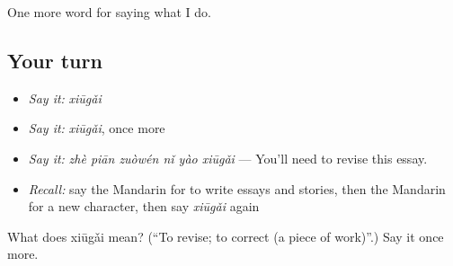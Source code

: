 \begin{grammarlens}[title={What you've built}]
One more word for saying what I do.
\end{grammarlens}

\subsection*{Your turn}
\begin{itemize}
\raggedright
  \item \emph{Say it:} \emph{xiūgǎi}
  \item \emph{Say it:} \emph{xiūgǎi}, once more
  \item \emph{Say it:} \emph{zhè piān zuòwén nǐ yào xiūgǎi} — You'll need to revise this essay.
  \item \emph{Recall:} say the Mandarin for to write essays and stories, then the Mandarin for a new character, then say \emph{xiūgǎi} again
\end{itemize}

\begin{tcolorbox}[breakable,colback=teal!4,colframe=teal!35!black,title={Before you move on}]
What does xiūgǎi mean? (\textquotedblleft{}To revise; to correct (a piece of work)\textquotedblright{}.) Say it once more.
\end{tcolorbox}
